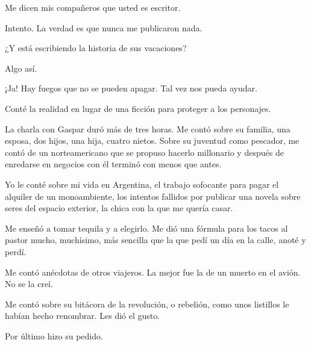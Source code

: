 \documentclass[12pt,twoside,openright,a5paper]{book}
\begin{document}
Me dicen mis compañeros que usted es escritor.

Intento. La verdad es que nunca me publicaron nada.

¿Y está escribiendo la historia de sus vacaciones?

Algo así.

¡Ja! Hay fuegos que no se pueden apagar. Tal vez nos pueda ayudar.



\vspace{0.5cm}
\hrulefill\hspace{0.2cm} \decofourleft\decofourright \hspace{0.2cm} \hrulefill
\vspace{0.5cm}

Conté la realidad en lugar de una ficción para proteger a los personajes.


\vspace{0.5cm}
\hrulefill\hspace{0.2cm} \decofourleft\decofourright \hspace{0.2cm} \hrulefill
\vspace{0.5cm}

La charla con Gaspar duró más de tres horas. Me contó sobre su familia,
una esposa, dos hijos, una hija, cuatro nietos. Sobre su juventud como
pescador, me contó de un norteamericano que se propuso hacerlo millonario
y después de enredarse en negocios con él terminó con menos que antes.

Yo le conté sobre mi vida en Argentina, el trabajo sofocante para pagar el
alquiler de un monoambiente, los intentos fallidos por publicar una novela
sobre seres del espacio exterior, la chica con la que me quería casar.

Me enseñó a tomar tequila y a elegirlo. Me dió una fórmula para los
tacos al pastor mucho, muchísimo, más sencilla que la que pedí un día
en la calle, anoté y perdí.

Me contó anécdotas de otros viajeros. La mejor fue la de un muerto en el
avión. No se la creí.

Me contó sobre su bitácora de la revolución, o rebelión, como unos
listillos le habían hecho renombrar. Les dió el gusto.

Por último hizo su pedido.

\afterpage{}
\vspace{0.5cm}
\hrulefill\hspace{0.2cm} \decofourleft\decofourright \hspace{0.2cm} \hrulefill
\vspace{0.5cm}
\end{document}
